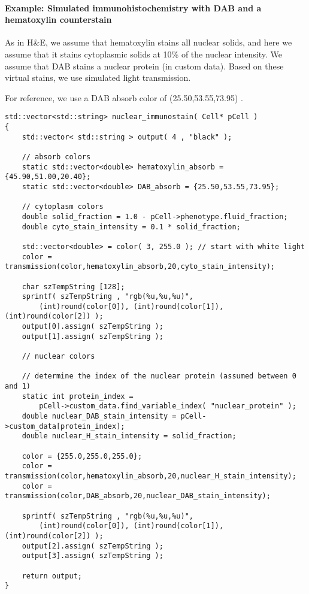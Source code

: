 \documentclass[12pt]{article}
\begin{document}
\paragraph{Example: Simulated immunohistochemistry with 
DAB and a hematoxylin counterstain} 
As in H\&E, we 
assume that hematoxylin stains all nuclear solids, and here 
we assume that it stains cytoplasmic solids at 10\% of the 
nuclear intensity. 
We assume that DAB stains a nuclear protein (in custom data). Based 
on these virtual stains, we use simulated light transmission. 

For reference, we use a DAB absorb color of 
(25.50,53.55,73.95) \cite{ref:H_and_E}. 
\begin{verbatim}
std::vector<std::string> nuclear_immunostain( Cell* pCell )
{
    std::vector< std::string > output( 4 , "black" ); 
 
    // absorb colors 
    static std::vector<double> hematoxylin_absorb = {45.90,51.00,20.40};
    static std::vector<double> DAB_absorb = {25.50,53.55,73.95};
 
    // cytoplasm colors 
    double solid_fraction = 1.0 - pCell->phenotype.fluid_fraction; 
    double cyto_stain_intensity = 0.1 * solid_fraction; 
  
    std::vector<double> = color( 3, 255.0 ); // start with white light 
    color = transmission(color,hematoxylin_absorb,20,cyto_stain_intensity);  
 
    char szTempString [128]; 
    sprintf( szTempString , "rgb(%u,%u,%u)", 
        (int)round(color[0]), (int)round(color[1]), (int)round(color[2]) ); 
    output[0].assign( szTempString ); 
    output[1].assign( szTempString ); 
 
    // nuclear colors 

    // determine the index of the nuclear protein (assumed between 0 and 1)
    static int protein_index = 
        pCell->custom_data.find_variable_index( "nuclear_protein" ); 
    double nuclear_DAB_stain_intensity = pCell->custom_data[protein_index]; 
    double nuclear_H_stain_intensity = solid_fraction; 

    color = {255.0,255.0,255.0}; 
    color = transmission(color,hematoxylin_absorb,20,nuclear_H_stain_intensity);
    color = transmission(color,DAB_absorb,20,nuclear_DAB_stain_intensity);
 
    sprintf( szTempString , "rgb(%u,%u,%u)", 
        (int)round(color[0]), (int)round(color[1]), (int)round(color[2]) ); 
    output[2].assign( szTempString ); 
    output[3].assign( szTempString ); 
 
    return output; 
}
\end{verbatim}
\end{document}
